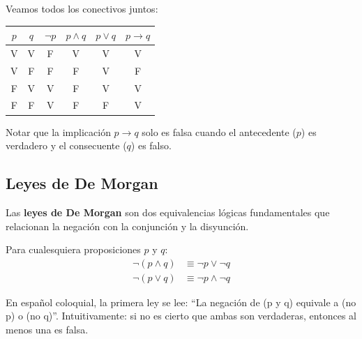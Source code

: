 \begin{ejemplo}
Veamos todos los conectivos juntos:

\begin{center}
\begin{tabular}{c|c|c|c|c|c}
$p$ & $q$ & $\lnot p$ & $p \land q$ & $p \lor q$ & $p \to q$ \\
\midrule
V & V & F & V & V & V \\
V & F & F & F & V & F \\
F & V & V & F & V & V \\
F & F & V & F & F & V
\end{tabular}
\end{center}

Notar que la implicación $p \to q$ solo es falsa cuando el antecedente
($p$) es verdadero y el consecuente ($q$) es falso.
\end{ejemplo}


\subsection{Leyes de De Morgan}

Las \textbf{leyes de De Morgan} son dos equivalencias lógicas
fundamentales que relacionan la negación con la conjunción y la disyunción.

\begin{teorema}
Para cualesquiera proposiciones $p$ y $q$:
\begin{align}
    \lnot (p \land q) &\equiv \lnot p \lor \lnot q \label{eq:dm1} \\
    \lnot (p \lor q)  &\equiv \lnot p \land \lnot q \label{eq:dm2}
\end{align}
\end{teorema}

\begin{observacion}
En español coloquial, la primera ley se lee:
``La negación de (p y q) equivale a (no p) o (no q)''.
Intuitivamente: si no es cierto que ambas son verdaderas, entonces
al menos una es falsa.
\end{observacion}


